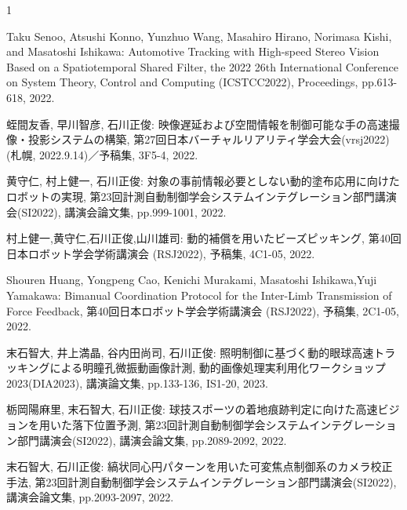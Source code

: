 





\begin{発表}{1}


Taku Senoo, Atsushi Konno, Yunzhuo Wang, Masahiro Hirano, Norimasa Kishi, and Masatoshi Ishikawa: Automotive Tracking with High-speed Stereo Vision Based on a Spatiotemporal Shared Filter, the 2022 26th International Conference on System Theory, Control and Computing (ICSTCC2022), Proceedings, pp.613-618, 2022.


蛭間友香, 早川智彦, 石川正俊: 映像遅延および空間情報を制御可能な手の高速撮像・投影システムの構築, 第27回日本バーチャルリアリティ学会大会(vrsj2022)(札幌, 2022.9.14)／予稿集, 3F5-4, 2022.


黄守仁, 村上健一, 石川正俊: 対象の事前情報必要としない動的塗布応用に向けたロボットの実現, 第23回計測自動制御学会システムインテグレーション部門講演会(SI2022), 講演会論文集, pp.999-1001, 2022.

村上健一,黄守仁,石川正俊,山川雄司: 動的補償を用いたビーズピッキング, 第40回日本ロボット学会学術講演会 (RSJ2022), 予稿集, 4C1-05, 2022.

Shouren Huang, Yongpeng Cao, Kenichi Murakami, Masatoshi Ishikawa,Yuji Yamakawa: Bimanual Coordination Protocol for the Inter-Limb Transmission of Force Feedback, 第40回日本ロボット学会学術講演会 (RSJ2022), 予稿集, 2C1-05, 2022.


末石智大, 井上満晶, 谷内田尚司, 石川正俊: 照明制御に基づく動的眼球高速トラッキングによる明瞳孔微振動画像計測, 動的画像処理実利用化ワークショップ2023(DIA2023), 講演論文集, pp.133-136, IS1-20, 2023.

栃岡陽麻里, 末石智大, 石川正俊: 球技スポーツの着地痕跡判定に向けた高速ビジョンを用いた落下位置予測, 第23回計測自動制御学会システムインテグレーション部門講演会(SI2022), 講演会論文集, pp.2089-2092, 2022.

末石智大, 石川正俊: 縞状同心円パターンを用いた可変焦点制御系のカメラ校正手法, 第23回計測自動制御学会システムインテグレーション部門講演会(SI2022), 講演会論文集, pp.2093-2097, 2022.


\end{発表}
